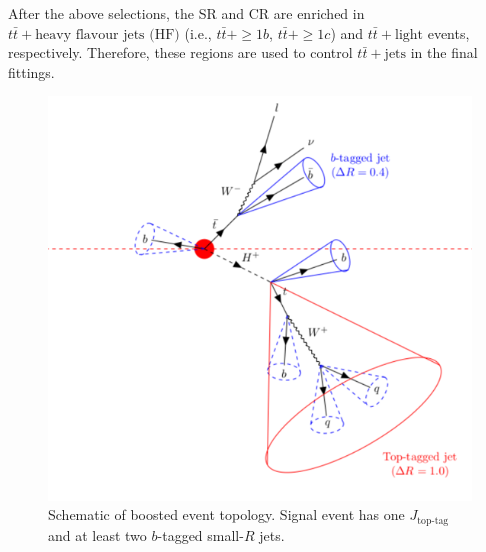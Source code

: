 After the above selections, the SR and CR are enriched in $t\bar{t}+\text{heavy flavour jets (HF)}$ (i.e., $t\bar{t}+\geq1b$, $t\bar{t}+\geq1c$) and $t\bar{t}+\text{light}$ events, respectively. Therefore, these regions are used to control $t\bar{t}+\text{jets}$ in the final fittings. 

\begin{figure}[H]
  \centering
  \includegraphics[keepaspectratio,scale=0.8]{images/AnalysisStrategy/EventTopology.png}
  \caption{Schematic of boosted event topology. Signal event has one $J_{\text{top-tag}}$ and at least two $b$-tagged small-$R$ jets.}
  \label{fig:EventTopology_Htb}
\end{figure}

